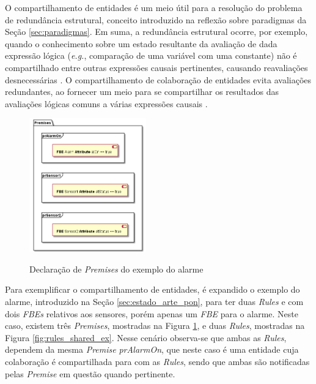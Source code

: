 O compartilhamento de entidades é um meio útil para a resolução do
problema de redundância estrutural, conceito introduzido na reflexão sobre
paradigmas da Seção \ref{sec:paradigmas}. Em suma, a redundância estrutural
ocorre, por exemplo, quando o conhecimento sobre um estado resultante da
avaliação de dada expressão lógica (\textit{e.g.}, comparação de uma variável com uma
constante) não é compartilhado entre outras expressões causais pertinentes,
causando reavaliações desnecessárias \cite{msc_Banaszewski_2009}. O
compartilhamento de colaboração de entidades evita avaliações redundantes, ao fornecer um meio
para se compartilhar os resultados das avaliações lógicas comuns a várias
expressões causais \cite{msc_Banaszewski_2009}.

\begin{figure}[!htb]
  \centering
  \caption{Declaração de \textit{Premises} do exemplo do alarme}
  \includegraphics[width=0.45\textwidth]{../out/diagrams/shared_premises/premises.png}
  \smallskip
  \label{fig:premises_shared_ex}
\end{figure}

Para exemplificar o compartilhamento de entidades, é expandido o exemplo do
alarme, introduzido na Seção \ref{sec:estado_arte_pon}, para ter duas
\textit{Rules} e com dois \textit{FBEs} relativos aos sensores, porém apenas um
\textit{FBE} para o alarme. Neste caso, existem três \textit{Premises},
mostradas na Figura \ref{fig:premises_shared_ex}, e duas \textit{Rules},
mostradas na Figura \ref{fig:rules_shared_ex}. Nesse cenário observa-se que
ambas as \textit{Rules}, dependem da mesma \textit{Premise} \textit{prAlarmOn},
que neste caso é uma entidade cuja colaboração é compartilhada para com as
\textit{Rules}, sendo que ambas são notificadas pelas \textit{Premise} em
questão quando pertinente.

